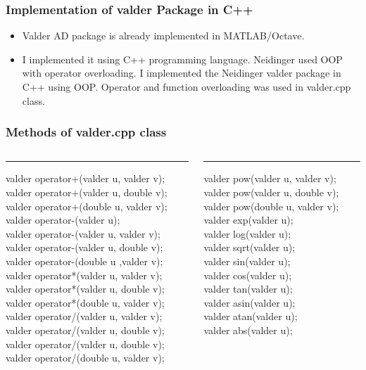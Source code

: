 \documentclass[10pt]{beamer}
\begin{document}
\begin{frame}
\frametitle{Implementation of valder Package in C++}
\begin{itemize}
\item  Valder AD package is already implemented in MATLAB/Octave.
\item I implemented it using C++ programming language. Neidinger used OOP with operator overloading. I implemented the Neidinger valder package in C++ using OOP. Operator and function overloading was used in valder.cpp class.

\end{itemize}
\end{frame}
\begin{frame}
\frametitle{Methods of valder.cpp class}
\begin{columns}[T] %
\begin{column}{.52\textwidth}
\color{black}\rule{\linewidth}{4pt}

valder operator+(valder u, valder v);\\
valder operator+(valder u, double v);\\
valder operator+(double u, valder v);\\
valder operator-(valder u);\\
valder operator-(valder u, valder v);\\
valder operator-(valder u, double v);\\
valder operator-(double u ,valder v);\\
valder operator*(valder u, valder v);\\
valder operator*(valder u, double v);\\
valder operator*(double u, valder v);\\
valder operator/(valder u, valder v);\\
valder operator/(valder u, double v);\\
valder operator/(valder u, double v);\\
valder operator/(double u, valder v);\\
\end{column}%
\hfill%
\begin{column}{.48\textwidth}
\color{blue}\rule{\linewidth}{4pt}

valder pow(valder u, valder v);\\
valder pow(valder u, double v);\\
valder pow(double u, valder v);\\
valder exp(valder u);\\
valder log(valder u);\\
valder sqrt(valder u);\\
valder sin(valder u);\\
valder cos(valder u);\\
valder tan(valder u);\\
valder asin(valder u);\\
valder atan(valder u);\\
valder abs(valder u);\\
\end{column}%
\end{columns}
\end{frame}
\end{document}
